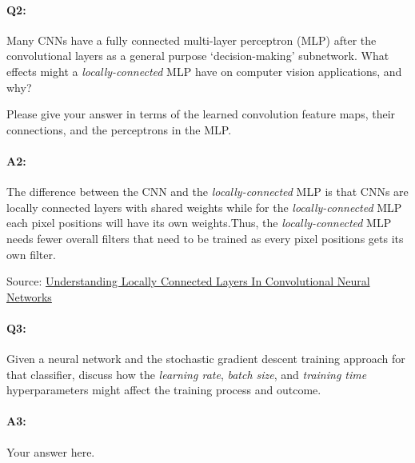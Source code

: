 \pagebreak
\paragraph{Q2:} Many CNNs have a fully connected multi-layer perceptron (MLP) after the convolutional layers as a general purpose `decision-making' subnetwork. What effects might a \emph{locally-connected} MLP have on computer vision applications, and why?

Please give your answer in terms of the learned convolution feature maps, their connections, and the perceptrons in the MLP.

\paragraph{A2:}

The difference between the CNN and the \emph{locally-connected} MLP is that CNNs are locally connected layers with shared weights while for the \emph{locally-connected} MLP each pixel positions will have its own weights.Thus, the \emph{locally-connected} MLP needs fewer overall filters that need to be trained as every pixel positions gets its own filter.


Source: \href{https://prateekvjoshi.com/2016/04/12/understanding-locally-connected-layers-in-convolutional-neural-networks/}{Understanding Locally Connected Layers In Convolutional Neural Networks}

\pagebreak
\paragraph{Q3:} Given a neural network and the stochastic gradient descent training approach for that classifier, discuss how the \emph{learning rate}, \emph{batch size}, and \emph{training time} hyperparameters might affect the training process and outcome.

\paragraph{A3:} Your answer here.

